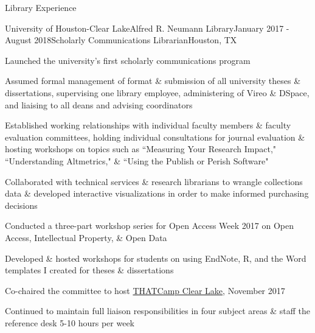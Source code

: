 \documentclass{resume} %
\begin{document}
\begin{rSection}{Library Experience}
\begin{rSubsection}{University of Houston-Clear Lake}{Alfred R. Neumann Library}{January 2017 - August 2018}{Scholarly Communications Librarian}{Houston, TX}
\item Launched the university's first scholarly communications program
\item Assumed formal management of format \& submission of all university theses \& dissertations, supervising one library employee, administering of Vireo \& DSpace, and liaising to all deans and advising coordinators
\item Established working relationships with individual faculty members \& faculty evaluation committees, holding individual consultations for journal evaluation \& hosting workshops on topics such as ``Measuring Your Research Impact," ``Understanding Altmetrics," \& ``Using the Publish or Perish Software"
\item Collaborated with technical services \& research librarians to wrangle collections data \& developed interactive visualizations in order to make informed purchasing decisions
\item Conducted a three-part workshop series for Open Access Week 2017 on Open Access, Intellectual Property, \& Open Data 
\item Developed \& hosted workshops for students on using EndNote, R, and the Word templates I created for theses \& dissertations
\item Co-chaired the committee to host \href{http://clearlake2017.thatcamp.org/}{THATCamp Clear Lake}, November 2017
\item Continued to maintain full liaison responsibilities in four subject areas \& staff the reference desk 5-10 hours per week
\end{rSubsection}



\end{rSection}
\end{document}
